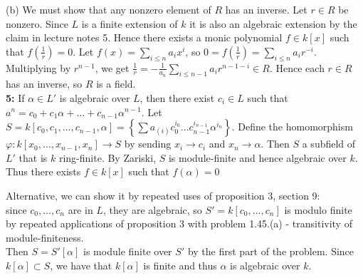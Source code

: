\documentclass[a4paper]{article}
\begin{document}
      (b) We must show that any nonzero element of $R$ has an inverse.
      Let $r \in R$ be nonzero. Since $L$ is a finite extension of $k$ it is also an
      algebraic extension by the claim in lecture notes 5. Hence there exists
      a monic polynomial  $f \in k\left[ x \right] $ such that $f(\frac{1}{r}) = 0$. Let
      $f (x) = \sum_{i\le n} a_i x^{i}$, so
      $0 = f\left( \frac{1}{r} \right) = \sum_{i\le n} a_i r^{-i}$. Multiplying
      by $r^{n-1}$, we get $\frac{1}{r} =
      - \frac{1}{a_n} \sum_{i\le n-1} a_i r^{n-1-i} \in R$. Hence each $r \in
      R$ has
      an inverse, so $R$ is a field.\\
      \linebreak
      \textbf{5:} If  $\alpha \in L'$ is algebraic over $L$,
      then there exist $c_i \in L$ such that\\
      $a^{n} = c_0 + c_1 \alpha
      + \ldots + c_{n-1}\alpha^{n-1}$.
       Let
      $ S = k \left[ c_0, c_1, \ldots, c_{n-1}, \alpha \right] = \left\{ 
      \sum a_{(i)} c_0^{i_0} \ldots c_{n-1}^{i_{n-1}} \alpha^{i_{n}} \right\}
      $.
     Define the homomorphism $\varphi  \colon k\left[ x_0, \ldots, x_{n-1},
      x_n \right] 
      \to S$ by sending $x_i \to c_i$ and $x_n \to \alpha$. Then
      $S$ a subfield of $L'$ that is $k$ ring-finite. By Zariski, $S$ is
      module-finite and hence algebraic over $k$. Thus there exists
      $f \in k[x]$ such that $f\left( \alpha \right) = 0$\\
      \linebreak

      Alternative, we can show it by repeated uses of proposition 3, section 9:
      \\
      since $c_0 ,\ldots, c_n$ are in $L$, they
      are algebraic, so 
      $S' = k\left[ c_0, \ldots, c_n \right] $ is
      modulo finite by repeated applications of proposition 3 with
      problem 1.45.(a) - transitivity of module-finiteness.\\
      Then $S = S'\left[ \alpha \right] $ is
      module finite over $S'$ by the first part of the problem.
      Since $k\left[ \alpha \right] \subset S$, we have
      that $k\left[ \alpha \right] $ is finite and thus
      $\alpha$ is algebraic over $k$.
     

    
\end{document}
